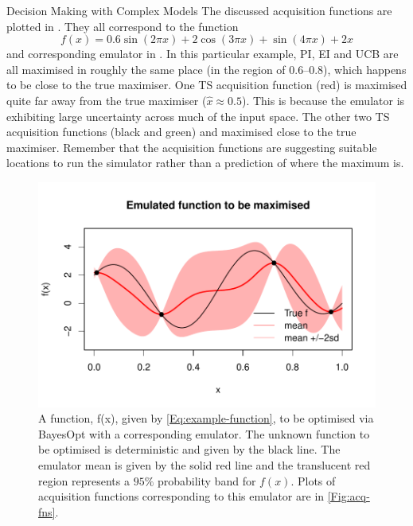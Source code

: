 \begin{chapter}{Decision Making with Complex Models \label{Chap:optimisation}}
The discussed acquisition functions are plotted in . They all correspond to the function
\begin{equation}
f(x) = 0.6 \sin (2 \pi x) + 2 \cos (3 \pi x) + \sin (4 \pi x) + 2x \label{Eq:example-function}
\end{equation}
and corresponding emulator in . In this particular example, PI, EI and UCB are all maximised in roughly the same place (in the region of $0.6$--$0.8$), which happens to be close to the true maximiser. One TS acquisition function (red) is maximised quite far away from the true maximiser ($\hat{x} \approx 0.5$). This is because the emulator is exhibiting large uncertainty across much of the input space. The other two TS acquisition functions (black and green) and maximised close to the true maximiser. Remember that the acquisition functions are suggesting suitable locations to run the simulator rather than a prediction of where the maximum is.
\begin{figure}[h]
 \centering
 \includegraphics[width=\textwidth]{fig-optim/example-fn-to-maximise.pdf}
 \caption{A function, f(x), given by \cref{Eq:example-function}, to be optimised via BayesOpt with a corresponding emulator. The unknown function to be optimised is deterministic and given by the black line. The emulator mean is given by the solid red line and the translucent red region represents a $95\%$ probability band for $f(x)$. Plots of acquisition functions corresponding to this emulator are in \cref{Fig:acq-fns}.  \label{Fig:example-fn}}
\end{figure}
\begin{figure}[h]
 \centering

\end{figure}
\end{chapter}
